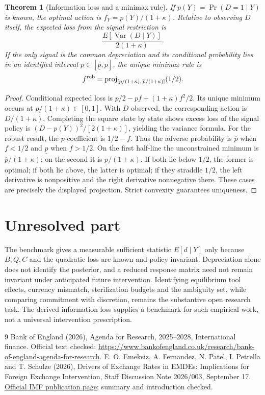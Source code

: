 \documentclass[11pt]{article}
\newtheorem{theorem}{Theorem}
\theoremstyle{definition}
\begin{document}
\begin{theorem}[Information loss and a minimax rule]
If $p(Y)=\Pr(D=1\mid Y)$ is known, the optimal action is $f_Y=p(Y)/(1+\kappa)$. Relative to observing $D$ itself, the expected loss from the signal restriction is
\[
 \frac{E[\operatorname{Var}(D\mid Y)]}{2(1+\kappa)}.
\]
If the only signal is the common depreciation and its conditional probability lies in an identified interval $p\in[\underline p,\overline p]$, the unique minimax rule is
\[
 f^{\rm rob}=\operatorname{proj}_{[\underline p/(1+\kappa),\,
                \overline p/(1+\kappa)]}(1/2).
\]
\end{theorem}
\begin{proof}
Conditional expected loss is $p/2-pf+(1+\kappa)f^2/2$. Its unique minimum occurs at $p/(1+\kappa)\in[0,1]$. With $D$ observed, the corresponding action is $D/(1+\kappa)$. Completing the square state by state shows excess loss of the signal policy is $(D-p(Y))^2/[2(1+\kappa)]$, yielding the variance formula.
For the robust result, the $p$-coefficient is $1/2-f$. Thus the adverse probability is $\overline p$ when $f<1/2$ and $\underline p$ when $f>1/2$. On the first half-line the unconstrained minimum is $\overline p/(1+\kappa)$; on the second it is $\underline p/(1+\kappa)$. If both lie below $1/2$, the former is optimal; if both lie above, the latter is optimal; if they straddle $1/2$, the left derivative is nonpositive and the right derivative nonnegative there. These cases are precisely the displayed projection. Strict convexity guarantees uniqueness.
\end{proof}

\section*{Unresolved part}
The benchmark gives a measurable sufficient statistic $E[d\mid Y]$ only because $B,Q,C$ and the quadratic loss are known and policy invariant. Depreciation alone does not identify the posterior, and a reduced response matrix need not remain invariant under anticipated future intervention. Identifying equilibrium tool effects, currency mismatch, sterilization budgets and the ambiguity set, while comparing commitment with discretion, remains the substantive open research task. The derived information loss supplies a benchmark for such empirical work, not a universal intervention prescription.
\begin{thebibliography}{9}
 Bank of England (2026), Agenda for Research, 2025--2028, International finance. Official text checked: \url{https://www.bankofengland.co.uk/research/bank-of-england-agenda-for-research}.
 E. O. Emeksiz, A. Fernandez, N. Patel, I. Petrella and T. Schulze (2026), Drivers of Exchange Rates in EMDEs: Implications for Foreign Exchange Intervention, Staff Discussion Note 2026/003, September 17. \href{https://www.imf.org/en/publications/staff-discussion-notes/issues/2026/09/16/drivers-of-exchange-rates-in-emdes-implications-for-foreign-exchange-intervention-578715}{Official IMF publication page}; summary and introduction checked.
\end{thebibliography}
\end{document}
